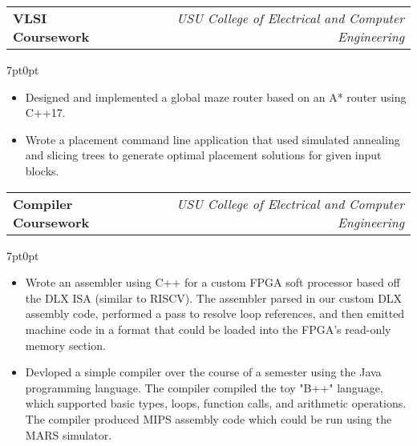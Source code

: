 \documentclass[letterpaper,12pt]{article}
\makeatletter
\newcommand{\simpleHeading}[2]{
    \vspace{-1pt}
    \begin{tabular*}{0.99\textwidth}[t]{l@{\extracolsep{\fill}}r}
        #1 & #2 \\
    \end{tabular*}
}
\newcommand{\simpleParagraph}[1]{
    \vspace{-1pt}
    \begin{adjustwidth}{7pt}{0pt}
        #1
    \end{adjustwidth}
}
\makeatother
\begin{document}
    \vspace{10pt}
    \simpleHeading{\textbf{VLSI Coursework}}{\textit{USU College of Electrical and Computer Engineering}}

    \simpleParagraph{
        \begin{itemize}
            \item Designed and implemented a global maze router based on an A* router using C++17.

            \item Wrote a placement command line application that used simulated annealing and slicing
                trees to generate optimal placement solutions for given input blocks.

        \end{itemize}
    }
    

    

    
    \vspace{10pt}
    \simpleHeading{\textbf{Compiler Coursework}}{\textit{USU College of Electrical and Computer Engineering}}

    \simpleParagraph{
        \begin{itemize}
            \item Wrote an assembler using C++ for a custom FPGA soft processor based off the DLX ISA (similar
                to RISCV). The assembler parsed in our custom DLX assembly code, performed a pass to resolve
                loop references, and then emitted machine code in a format that could be loaded into the FPGA's 
                read-only memory section.

            \item Devloped a simple compiler over the course of a semester using the Java programming language.
                The compiler compiled the toy "B++" language, which supported basic types, loops, function calls,
                and arithmetic operations. The compiler produced MIPS assembly code which could be run using the 
                MARS simulator.

        \end{itemize}
    }
    
\end{document}
